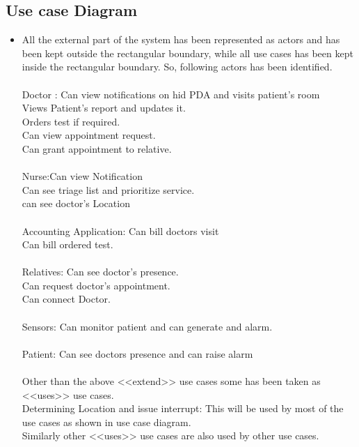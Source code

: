 \documentclass[a4paper,10pt]{report} %
\begin{document}
\subsection {Use case Diagram}
\begin{itemize}
\item All the external part of the system has been represented as
actors and has been kept outside the rectangular boundary, while all use
cases has been kept inside the rectangular boundary. So, following
actors has been identified. \\ \\
Doctor : Can view notifications on hid PDA  and visits patient's room\\
Views Patient's report and updates it.\\
Orders test if required.\\
Can view appointment request.\\
Can grant appointment to relative. \\ \\
Nurse:Can view Notification \\
Can see triage list and prioritize service.\\
can see doctor's Location\\ \\
Accounting Application: Can bill doctors visit \\
Can bill ordered test.\\ \\
Relatives: Can see doctor's presence. \\
Can request doctor's appointment. \\
Can connect Doctor. \\ \\
Sensors: Can monitor patient and can generate and alarm. \\ \\
Patient: Can see doctors presence and can raise alarm \\ \\

Other than the above <<extend>> use cases some has been taken as
<<uses>> use cases. \\
Determining Location and issue interrupt: This will be used by most of
the use cases as shown in use case diagram.\\
Similarly other <<uses>> use cases are also used by other use cases.
\end{itemize}
   
\end{document}
